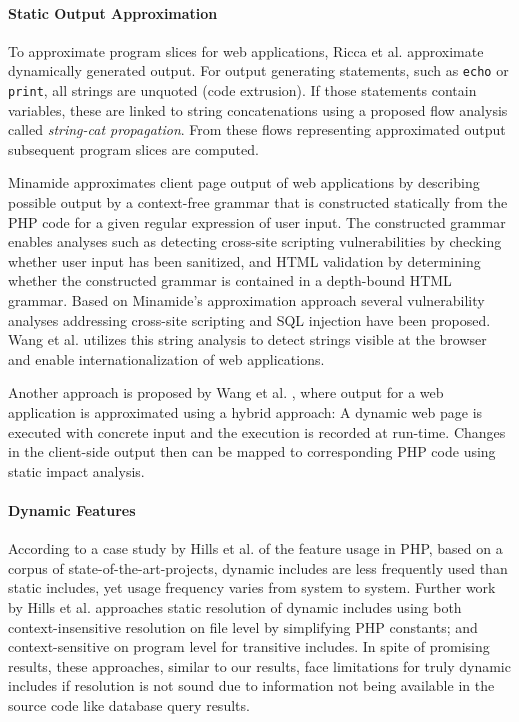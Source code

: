 \documentclass[sigconf, preprint]{acmart}
\renewcommand{\tt}[1]{\texttt{#1}}
\begin{document}
\paragraph{Static Output Approximation}
To approximate program slices for web
applications, Ricca et al. \cite{tonella_web_2005,tonella_2001,tonella_2002} approximate
dynamically generated output. For output generating statements, such as \tt{echo} or
\tt{print}, all strings are unquoted (code extrusion). If those statements
contain variables, these are linked to string concatenations using a
proposed flow analysis called \emph{string-cat propagation}. From these
flows representing approximated output subsequent program slices are computed.

Minamide \cite{minamide_static_2005} approximates client page output
of web applications by describing possible output by a context-free
grammar that is constructed statically from the PHP code for a given regular
expression of user input. The constructed grammar enables analyses such as
detecting cross-site scripting vulnerabilities by checking whether user input
has been sanitized, and HTML validation by determining whether the constructed
grammar is contained in a depth-bound HTML grammar. Based on Minamide's
approximation approach several vulnerability analyses addressing cross-site
scripting \cite{wassermann_static_2008} and SQL injection
\cite{wassermann2007sound} have been proposed. Wang et al.
\cite{wang_locating_2010} utilizes this string analysis to detect strings
visible at the browser and enable internationalization of web applications.
    
Another approach is proposed by Wang et al. \cite{wang_automating_2012}, where
output for a web application is approximated using a hybrid approach: A
dynamic web page is executed with concrete input and the execution is
recorded at run-time. Changes in the client-side output then can be mapped to 
corresponding PHP code using static impact analysis.

\paragraph{Dynamic Features}
According to a case study by Hills et al. \cite{Hills:2013:ESP:2483760.2483786}
of the feature usage in PHP, based on a corpus of state-of-the-art-projects,
dynamic includes are less frequently used than static includes, yet usage
frequency varies from system to system. Further work by Hills et al.
\cite{hills2014static,hills2014php} approaches static resolution of dynamic includes using
both context-insensitive resolution on file level by simplifying PHP constants;
and context-sensitive on program level for transitive includes. In spite of 
promising results, these approaches, similar to our results, face limitations
for truly dynamic includes if resolution is not sound due to information not
being available in the source code like database query results.
\end{document}
